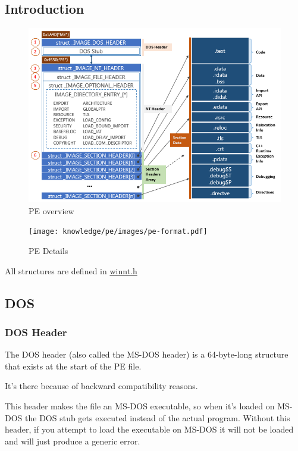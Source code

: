 \subsection{Introduction}

\begin{figure}[!ht]
    \includegraphics[width=\linewidth]{knowledge/pe/images/Gen_DD_Win_PE_Format.png}
    \caption{PE overview}
    \label{fig:pe_overview}
\end{figure}

\begin{figure}[!ht]
    \texttt{[image: knowledge/pe/images/pe-format.pdf]}
    \caption{PE Details}
    \label{fig:pe_details}
\end{figure}

All structures are defined in \href{https://learn.microsoft.com/fr-fr/windows/win32/api/winnt/}{winnt.h}





\subsection{DOS}

\subsubsection{DOS Header}
The DOS header (also called the MS-DOS header) is a 64-byte-long structure that exists at the start of the PE file.

It’s there because of backward compatibility reasons. 

This header makes the file an MS-DOS executable, so when it’s loaded on MS-DOS the DOS stub gets executed instead of the actual program.
Without this header, if you attempt to load the executable on MS-DOS it will not be loaded and will just produce a generic error.

